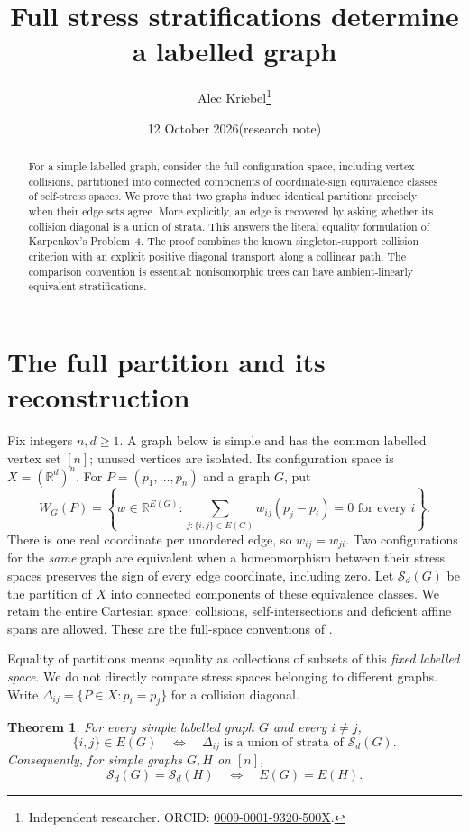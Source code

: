 \documentclass[11pt]{article}
\title{Full stress stratifications determine a labelled graph}
\author{Alec Kriebel\thanks{Independent researcher. ORCID:
\href{https://orcid.org/0009-0001-9320-500X}{0009-0001-9320-500X}.}}
\date{12 October 2026\quad (research note)}
\newtheorem{theorem}{Theorem}
\newcommand{\R}{\mathbb R}
\newcommand{\Sg}{\mathcal S}
\begin{document}
\maketitle
\begin{abstract}
For a simple labelled graph, consider the full configuration space, including
vertex collisions, partitioned into connected components of coordinate-sign
equivalence classes of self-stress spaces. We prove that two graphs induce
identical partitions precisely when their edge sets agree. More explicitly, an
edge is recovered by asking whether its collision diagonal is a union of strata.
This answers the literal equality formulation of Karpenkov's Problem~4.
The proof combines the known singleton-support collision criterion with an
explicit positive diagonal transport along a collinear path. The comparison
convention is essential: nonisomorphic trees can have ambient-linearly equivalent
stratifications.
\end{abstract}

\section{The full partition and its reconstruction}
Fix integers $n,d\geq1$. A graph below is simple and has the common labelled
vertex set $[n]$; unused vertices are isolated. Its configuration space is
$X=(\R^d)^n$. For $P=(p_1,\ldots,p_n)$ and a graph $G$, put
\[
 W_G(P)=\left\{w\in\R^{E(G)}:
 \sum_{j:\{i,j\}\in E(G)}w_{ij}(p_j-p_i)=0\text{ for every }i\right\}.
\]
There is one real coordinate per unordered edge, so $w_{ij}=w_{ji}$.
Two configurations for the \emph{same} graph are equivalent when a homeomorphism
between their stress spaces preserves the sign of every edge coordinate,
including zero. Let $\Sg_d(G)$ be the partition of $X$ into connected components
of these equivalence classes. We retain the entire Cartesian space: collisions,
self-intersections and deficient affine spans are allowed. These are the
full-space conventions of \cite{DKS,Karpenkov}.

Equality of partitions means equality as collections of subsets of this
\emph{fixed labelled space}. We do not directly compare stress spaces belonging
to different graphs. Write
$\Delta_{ij}=\{P\in X:p_i=p_j\}$ for a collision diagonal.

\begin{theorem}\label{thm:main}
For every simple labelled graph $G$ and every $i\ne j$,
\[
 \{i,j\}\in E(G)
 \quad\Longleftrightarrow\quad
 \Delta_{ij}\text{ is a union of strata of }\Sg_d(G).
\]
Consequently, for simple graphs $G,H$ on $[n]$,
\[
 \Sg_d(G)=\Sg_d(H)\quad\Longleftrightarrow\quad E(G)=E(H).
\]
\end{theorem}
\end{document}
